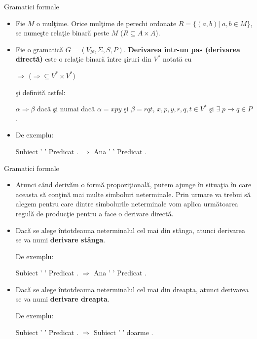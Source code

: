 \documentclass[pdf]{beamer}
\begin{document}
\begin{frame}{Gramatici formale}
\begin{itemize}
\item
Fie $M$ o mulţime. Orice mulţime de perechi ordonate $R = \{ (a, b)| \; a,b \in M \}$, se numeşte relaţie binară peste $M$ ($R \subseteq A \times A$).
\item
Fie o gramatică $G = (V_{N}, \Sigma, S, P)$. \textbf{Derivarea într-un pas (derivarea directă)} este o relaţie binară între şiruri din $V^{*}$ notată cu 

$\Rightarrow$ ($\Rightarrow \subseteq V^{*} \times V^{*}$) 

şi definită astfel:

$\alpha \Rightarrow \beta$ dacă şi numai dacă $\alpha = xpy$ şi $\beta = rqt$, $x,p,y,r,q,t \in V^{*}$ şi $\exists \; p \rightarrow q \in P$.

\item
De exemplu:

Subiect ' ' Predicat . $\Rightarrow$ Ana ' ' Predicat .
\end{itemize}
\end{frame}



\begin{frame}{Gramatici formale}
\begin{itemize}
\item
Atunci când derivăm o formă propoziţională, putem ajunge în situaţia în care aceasta să conţină mai multe simboluri neterminale. Prin urmare va trebui să alegem pentru care dintre simbolurile neterminale vom aplica următoarea regulă de producţie pentru a face o derivare directă. 
\item
Dacă se alege întotdeauna neterminalul cel mai din stânga, atunci derivarea se va numi \textbf{derivare stânga}. 

De exemplu:

Subiect ' ' Predicat . $\Rightarrow$ Ana ' ' Predicat .

\item
Dacă se alege întotdeauna neterminalul cel mai din dreapta, atunci derivarea se va numi \textbf{derivare dreapta}.

De exemplu:

Subiect ' ' Predicat . $\Rightarrow$ Subiect ' ' doarme .
\end{itemize}
\end{frame}
\end{document}
